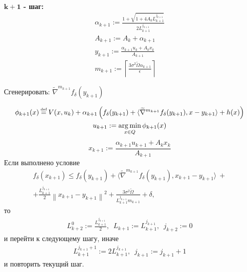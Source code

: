 \documentclass[11pt,a4]{article}
\newcommand{\norm}[1]{\left\lVert#1\right\rVert}
\newtheorem{remark}{Замечание}
\newcommand\myeq{\mathrel{\stackrel{\makebox[0pt]{\mbox{\normalfont\tiny def}}}{=}}}
\DeclareMathOperator*{\argmin}{arg\,min}
\begin{document}
\begin{mdframed}
\textbf{$\boldsymbol{k+1}$ - шаг:}
\begin{gather}
\alpha_{k+1} := \frac{1 + \sqrt{1 + 4A_kL_{k+1}^{j_{k+1}}}}{2L_{k+1}^{j_{k+1}}} \label{eqymir2DLSTA}\\
A_{k+1} := A_k + \alpha_{k+1}\\
y_{k+1} := \frac{\alpha_{k+1}u_k + A_k x_k}{A_{k+1}} \label{eqymir2DLST}\\
m_{k+1} := \left\lceil\frac{3\sigma^2\widetilde{\Omega}\alpha_{k+1}}{\epsilon}\right\rceil
\label{eqymir2DLSTMK}
\end{gather}
\begin{center}
Сгенерировать: $ \widetilde{\nabla}^{m_{k+1}} f_\delta(y_{k+1})$
\end{center}
\begin{equation}
\begin{gathered}
\phi_{k+1}(x) \myeq V(x, u_k) + \alpha_{k+1}\left(f_\delta(y_{k+1}) + \langle \widetilde{\nabla}^{m_{k+1}} f_\delta(y_{k+1}), x - y_{k+1} \rangle + h(x)\right)\\
u_{k+1} := \argmin_{x \in Q}\phi_{k+1}(x) \label{equmir2DLST}
\end{gathered}
\end{equation}
\begin{equation}
x_{k+1} := \frac{\alpha_{k+1}u_{k+1} + A_k x_k}{A_{k+1}} \label{eqxmir2DLST}
\end{equation}
Если выполнено условие
\begin{equation}
\begin{gathered}
f_\delta(x_{k+1}) \leq f_\delta(y_{k+1}) + \langle \widetilde{\nabla}^{m_{k+1}} f_\delta(y_{k+1}), x_{k+1} - y_{k+1} \rangle\ +\\  + \frac{L_{k+1}^{j_{k+1}}}{2}\norm{x_{k+1} - y_{k+1}}^2 + \frac{3\sigma^2\widetilde{\Omega}}{L_{k+1}^{j_{k+1}}m_{k+1}} + \delta,
\label{exitLDLST}
\end{gathered}
\end{equation}
то
\begin{gather}
L_{k+2}^0 := \frac{L_{k+1}^{j_{k+1}}}{2},\,\,\,L_{k+1} := L_{k+1}^{j_{k+1}},\,\,\,j_{k+2} := 0
\end{gather}
и перейти к следующему шагу, иначе
\begin{gather}
L_{k+1}^{j_{k+1} + 1} := 2L_{k+1}^{j_{k+1}},\,\,\,j_{k+1} := j_{k+1} + 1
\end{gather}
и повторить текущий шаг.
\end{mdframed}

\iffalse
\begin{remark}
\leavevmode
\label{remark1ST}
В Лемме \ref{corST2} стоят два слагаемых $\frac{2\sigma^2\widetilde{\Omega}}{Lm_{k+1}}$ и $\frac{3L}{4}\norm{x - y}^2$, в то время, как в (\ref{exitLDLST}) стоят $\frac{3\sigma^2\widetilde{\Omega}}{L_{k+1}m_{k+1}}$ и $\frac{L_{k+1}}{2}\norm{x_{k+1} - y_{k+1}}^2$. Эти два слагаемых эквивалентны при выборе $L_{k+1} = \frac{3}{2}L$. Запись этих слагаемых в (\ref{exitLDLST}) более удобная для доказательства.
\end{remark}
\fi
\end{document}
